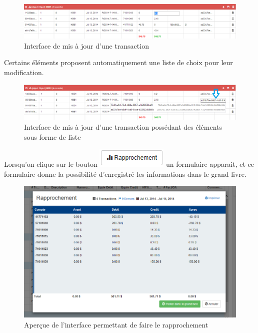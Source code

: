 \documentclass[12pt,a4paper]{report}
\begin{document}
\begin{figure}[h]
\begin{center}
\includegraphics[width=14cm]{pic/TransactionEdit.png}
\end{center}
\caption{Interface de mis à jour d'une transaction}
\label{Interface de mis à jour d'une transaction}
\end{figure}

Certains éléments proposent automatiquement une liste de choix pour leur modification.

\begin{figure}[h]
\begin{center}
\includegraphics[width=14cm]{pic/TransactionEditListe.png}
\end{center}
\caption{Interface de mis à jour d'une transaction possédant des éléments sous forme de liste}
\label{Interface de mis à jour d'une transaction possédant des éléments sous forme de liste}
\end{figure}

Lorsqu'on clique sur le bouton \includegraphics[scale=0.7]{pic/Rapprochement.png}  un formulaire apparait, et ce formulaire donne la possibilité d'enregistré les informations dans le grand livre. 
\begin{figure}[h]
\begin{center}
\includegraphics[width=14cm]{pic/RapprochementMenu.png}
\end{center}
\caption{Aperçue de l'interface permettant de faire le rapprochement}
\label{Aperçue de l'interface permettant de faire le rapprochement}
\end{figure}
\end{document}
